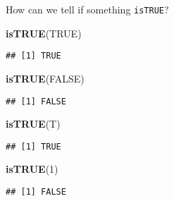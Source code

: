 \documentclass[ignorenonframetext,]{beamer}
\newenvironment{Shaded}{\begin{snugshade}}{\end{snugshade}}
\newcommand{\KeywordTok}[1]{\textcolor[rgb]{0.13,0.29,0.53}{\textbf{#1}}}
\newcommand{\DecValTok}[1]{\textcolor[rgb]{0.00,0.00,0.81}{#1}}
\newcommand{\OtherTok}[1]{\textcolor[rgb]{0.56,0.35,0.01}{#1}}
\newcommand{\NormalTok}[1]{#1}
\begin{document}
\begin{frame}[fragile]{How can we tell if something \texttt{isTRUE}?}

\begin{Shaded}
\begin{Highlighting}[]
\KeywordTok{isTRUE}\NormalTok{(}\OtherTok{TRUE}\NormalTok{)}
\end{Highlighting}
\end{Shaded}

\begin{verbatim}
## [1] TRUE
\end{verbatim}

\begin{Shaded}
\begin{Highlighting}[]
\KeywordTok{isTRUE}\NormalTok{(}\OtherTok{FALSE}\NormalTok{)}
\end{Highlighting}
\end{Shaded}

\begin{verbatim}
## [1] FALSE
\end{verbatim}

\begin{Shaded}
\begin{Highlighting}[]
\KeywordTok{isTRUE}\NormalTok{(T)}
\end{Highlighting}
\end{Shaded}

\begin{verbatim}
## [1] TRUE
\end{verbatim}

\begin{Shaded}
\begin{Highlighting}[]
\KeywordTok{isTRUE}\NormalTok{(}\DecValTok{1}\NormalTok{)}
\end{Highlighting}
\end{Shaded}

\begin{verbatim}
## [1] FALSE
\end{verbatim}

\end{frame}
\end{document}
